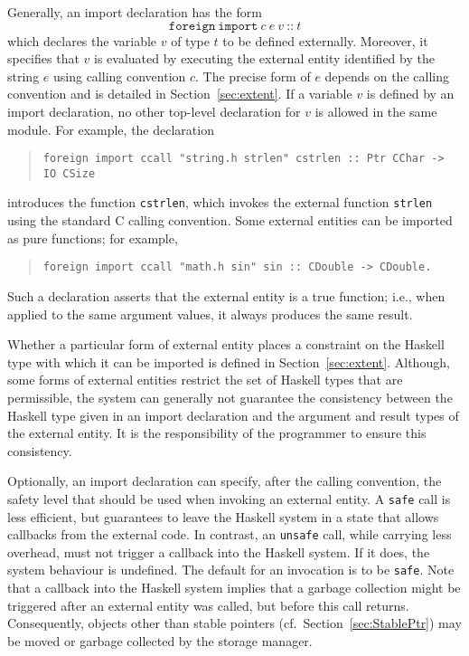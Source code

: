 \documentclass[a4paper,twoside]{article}
\newcommand{\code}[1]{\texttt{#1}}      %
\begin{document}
Generally, an import declaration has the form
%
\[
\code{foreign}~\code{import}~c~e~v~\code{{::}}~t
\]
%
which declares the variable $v$ of type $t$ to be defined externally.
Moreover, it specifies that $v$ is evaluated by executing the external entity
identified by the string $e$ using calling convention $c$.  The precise form
of $e$ depends on the calling convention and is detailed in
Section~\ref{sec:extent}.  If a variable $v$ is defined by an import
declaration, no other top-level declaration for $v$ is allowed in the same
module.  For example, the declaration
%
\begin{quote}
\begin{verbatim}
foreign import ccall "string.h strlen" cstrlen :: Ptr CChar -> IO CSize
\end{verbatim}
\end{quote}
%
introduces the function \code{cstrlen}, which invokes the external function
\code{strlen} using the standard C calling convention.  Some external entities
can be imported as pure functions; for example,
%
\begin{quote}
\begin{verbatim}
foreign import ccall "math.h sin" sin :: CDouble -> CDouble.
\end{verbatim}
\end{quote}
%
Such a declaration asserts that the external entity is a true function; i.e.,
when applied to the same argument values, it always produces the same result.

Whether a particular form of external entity places a constraint on the
Haskell type with which it can be imported is defined in
Section~\ref{sec:extent}.  Although, some forms of external entities restrict
the set of Haskell types that are permissible, the system can generally not
guarantee the consistency between the Haskell type given in an import
declaration and the argument and result types of the external entity.  It is
the responsibility of the programmer to ensure this consistency.

Optionally, an import declaration can specify, after the calling convention,
the safety level that should be used when invoking an external entity.  A
\code{safe} call is less efficient, but guarantees to leave the Haskell system
in a state that allows callbacks from the external code.  In contrast, an
\code{unsafe} call, while carrying less overhead, must not trigger a callback
into the Haskell system.  If it does, the system behaviour is undefined.  The
default for an invocation is to be \code{safe}.  Note that a callback into
the Haskell system implies that a garbage collection might be triggered after
an external entity was called, but before this call returns.  Consequently,
objects other than stable pointers (cf.\ Section~\ref{sec:StablePtr}) may be
moved or garbage collected by the storage manager.
\end{document}
